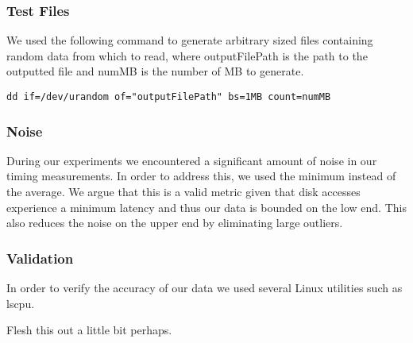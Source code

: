 \subsubsection{Test Files}
We used the following command to generate arbitrary sized files containing random
data from which to read, where outputFilePath is the path to the outputted file and numMB is the number of MB to generate.

\begin{verbatim}
dd if=/dev/urandom of="outputFilePath" bs=1MB count=numMB
\end{verbatim}

\subsubsection{Noise}
During our experiments we encountered a significant amount of noise in our timing measurements. In order to address this, we used the minimum instead of the average. 
We argue that this is a valid metric given that disk accesses experience a minimum latency and thus our data is bounded on the low end. This also reduces the noise on the upper end by eliminating large outliers.

\subsubsection{Validation}
In order to verify the accuracy of our data we used several Linux utilities such as
lscpu. 

Flesh this out a little bit perhaps.

